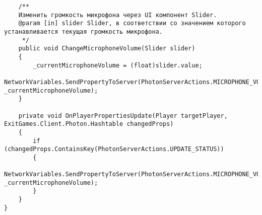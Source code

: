 \begin{verbatim}
    /** 
    Изменить громкость микрофона через UI компонент Slider.
    @param [in] slider Slider, в соответствии со значением которого устанавливается текущая громкость микрофона.
     */
    public void ChangeMicrophoneVolume(Slider slider)
    {
        _currentMicrophoneVolume = (float)slider.value;
        NetworkVariables.SendPropertyToServer(PhotonServerActions.MICROPHONE_VOLUME, _currentMicrophoneVolume);
    }

    private void OnPlayerPropertiesUpdate(Player targetPlayer, ExitGames.Client.Photon.Hashtable changedProps)
    {
        if (changedProps.ContainsKey(PhotonServerActions.UPDATE_STATUS))
        {
            NetworkVariables.SendPropertyToServer(PhotonServerActions.MICROPHONE_VOLUME, _currentMicrophoneVolume);
        }
    }
}

\end{verbatim}
